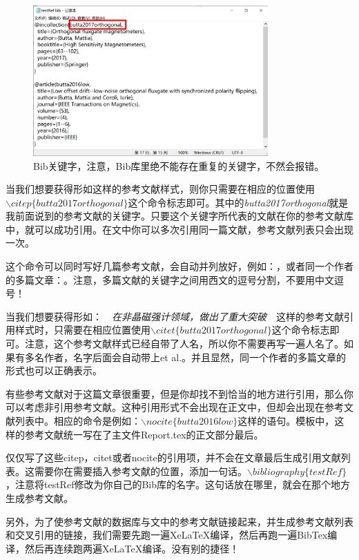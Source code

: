 \begin{figure}[H]
\label{fig06}
\centering
\includegraphics[width=9cm]{PICS/Cite6.png}
\caption{Bib关键字，注意，Bib库里绝不能存在重复的关键字，不然会报错。}
\end{figure}\par
{}
当我们想要获得形如\citep{butta2017orthogonal}这样的参考文献样式，则你只需要在相应的位置使用$\backslash citep\{butta2017orthogonal\}$这个命令标志即可。其中的\textit{butta2017orthogonal}就是我前面说到的参考文献的关键字。只要这个关键字所代表的文献在你的参考文献库中，就可以成功引用。在文中你可以多次引用同一篇文献，参考文献列表只会出现一次。\par
这个命令可以同时写好几篇参考文献，会自动并列放好，例如：\citep{Yuan2020Graphene, butta2017orthogonal}，或者同一个作者的多篇文章：\citep{butta2017orthogonal, butta2012orthogonal}。注意，多篇文献的关键字之间用西文的逗号分割，不要用中文逗号！\par
{}
当我们想要获得形如：\ \ \textit{在非晶磁强计领域，\citet{butta2017orthogonal}做出了重大突破}\ \ 这样的参考文献引用样式时，只需要在相应位置使用$\backslash citet\{butta2017orthogonal\}$这个命令标志即可。注意，这个参考文献样式已经自带了人名，所以你不需要再写一遍人名了。如果有多名作者，名字后面会自动带上et al.。并且显然，同一个作者的多篇文章\citet{butta2017orthogonal, butta2012orthogonal}的形式也可以正确表示。\par
{}
有些参考文献对于这篇文章很重要，但是你却找不到恰当的地方进行引用，那么你可以考虑非引用参考文献。这种引用形式不会出现在正文中，但却会出现在参考文献列表中。相应的命令是例如：$\backslash nocite\{butta2016low\}$这样的语句。模板中，这样的参考文献统一写在了主文件Report.tex的正文部分最后。\par
{}
仅仅写了这些citep，citet或者nocite的引用项，并不会在文章最后生成引用文献列表。这需要你在需要插入参考文献的位置，添加一句话。$\backslash bibliography\{testRef\}$，注意将testRef修改为你自己的Bib库的名字。这句话放在哪里，就会在那个地方生成参考文献。\par
另外，为了使参考文献的数据库与文中的参考文献链接起来，并生成参考文献列表和交叉引用的链接，我们需要{\Large{\color{red}先跑一遍XeLaTeX编译，然后再跑一遍BibTex编译，然后再连续跑两遍XeLaTeX编译}}。没有别的捷径！
